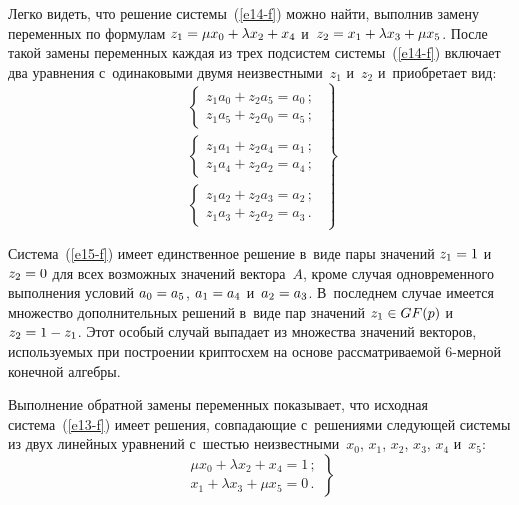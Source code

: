 \begin{multicols}{2}
  Легко видеть, что решение системы~(\ref{e14-f}) можно найти, выполнив  
замену переменных по формулам $z_1\hm= \mu x_0\hm+ \lambda x_2\hm+ x_4$ 
и~$z_2\hm= x_1\hm+\lambda x_3\hm+\mu x_5$. После такой замены 
переменных каждая из трех подсистем системы~(\ref{e14-f}) включает два 
уравнения с~одинаковыми двумя неизвестными~$z_1$ и~$z_2$ и~приобретает 
вид:
  \begin{equation}
  \left.
  \begin{array}{l}
  \left\{
  \begin{array}{c}
  z_1a_0+z_2a_5=a_0\,;\\[3pt]
  z_1a_5+z_2a_0=a_5\,;
  \end{array}
  \right.\\[12pt]
  \left\{
  \begin{array}{c}
  z_1a_1+z_2a_4=a_1\,;\\[3pt]
  z_1a_4+z_2a_2=a_4\,;
  \end{array}
  \right.\\[12pt]
  \left\{
  \begin{array}{c}
  z_1a_2+z_2a_3=a_2\,;\\[3pt]
  z_1a_3+z_2a_2=a_3\,.
  \end{array}
  \right.
  \end{array}
  \right\}
  \label{e15-f}
  \end{equation}
                  
  
  Система~(\ref{e15-f}) имеет единственное решение в~виде пары значений 
$z_1\hm=1$ и~$z_2\hm=0$ для всех возможных значений вектора~$A$, кроме 
случая одновременного выполнения условий $a_0\hm=a_5$, $a_1\hm= a_4$ 
и~$a_2\hm= a_3$. В~последнем случае имеется множество дополнительных 
решений в~виде пар значений $z_1\hm\in GF(p)$ и~$z_2\hm= 1\hm -z_1$. Этот 
особый случай выпадает из множества значений векторов, используемых при 
построении криптосхем на основе рассматриваемой 6-мер\-ной конечной 
алгебры.
  
  Выполнение обратной замены переменных показывает, что исходная 
система~(\ref{e13-f}) имеет решения, совпадающие с~решениями следующей 
системы из двух линейных уравнений с~шестью неизвестными~$x_0$, $x_1$, 
$x_2$, $x_3$, $x_4$ и~$x_5$:
  \begin{equation}
  \left.
  \begin{matrix}
  \mu x_0+\lambda x_2+x_4=1\,;\\
  x_1+\lambda x_3+\mu x_5=0\,.
  \end{matrix}
  \right\}
  \label{e16-f}
  \end{equation}
  

\end{multicols}
